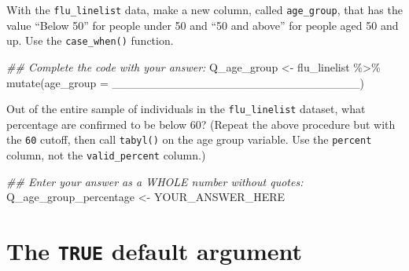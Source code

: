 \documentclass[
  letterpaper,
  DIV=11,
  numbers=noendperiod]{scrreprt}
\newenvironment{Shaded}{\begin{snugshade}}{\end{snugshade}}
\newcommand{\AttributeTok}[1]{\textcolor[rgb]{0.40,0.45,0.13}{#1}}
\newcommand{\DocumentationTok}[1]{\textcolor[rgb]{0.37,0.37,0.37}{\textit{#1}}}
\newcommand{\FunctionTok}[1]{\textcolor[rgb]{0.28,0.35,0.67}{#1}}
\newcommand{\NormalTok}[1]{\textcolor[rgb]{0.00,0.23,0.31}{#1}}
\newcommand{\OtherTok}[1]{\textcolor[rgb]{0.00,0.23,0.31}{#1}}
\newcommand{\SpecialCharTok}[1]{\textcolor[rgb]{0.37,0.37,0.37}{#1}}
\begin{document}
\begin{tcolorbox}[enhanced jigsaw, title=\textcolor{quarto-callout-tip-color}{\faLightbulb}\hspace{0.5em}{Practice}, colbacktitle=quarto-callout-tip-color!10!white, leftrule=.75mm, arc=.35mm, opacityback=0, bottomrule=.15mm, rightrule=.15mm, toptitle=1mm, breakable, toprule=.15mm, colback=white, coltitle=black, colframe=quarto-callout-tip-color-frame, bottomtitle=1mm, titlerule=0mm, left=2mm, opacitybacktitle=0.6]

With the \texttt{flu\_linelist} data, make a new column, called
\texttt{age\_group}, that has the value ``Below 50'' for people under 50
and ``50 and above'' for people aged 50 and up. Use the
\texttt{case\_when()} function.

\begin{Shaded}
\begin{Highlighting}[]
\DocumentationTok{\#\# Complete the code with your answer:}
\NormalTok{Q\_age\_group }\OtherTok{\textless{}{-}} 
\NormalTok{  flu\_linelist }\SpecialCharTok{\%\textgreater{}\%} 
  \FunctionTok{mutate}\NormalTok{(}\AttributeTok{age\_group =}\NormalTok{ \_\_\_\_\_\_\_\_\_\_\_\_\_\_\_\_\_\_\_\_\_\_\_\_\_\_\_\_\_\_)}
\end{Highlighting}
\end{Shaded}

Out of the entire sample of individuals in the \texttt{flu\_linelist}
dataset, what percentage are confirmed to be below 60? (Repeat the above
procedure but with the \texttt{60} cutoff, then call \texttt{tabyl()} on
the age group variable. Use the \texttt{percent} column, not the
\texttt{valid\_percent} column.)

\begin{Shaded}
\begin{Highlighting}[]
\DocumentationTok{\#\# Enter your answer as a WHOLE number without quotes:}
\NormalTok{Q\_age\_group\_percentage }\OtherTok{\textless{}{-}}\NormalTok{ YOUR\_ANSWER\_HERE}
\end{Highlighting}
\end{Shaded}

\end{tcolorbox}

\section{\texorpdfstring{The \texttt{TRUE} default
argument}{The TRUE default argument}}\label{the-true-default-argument}
\end{document}
